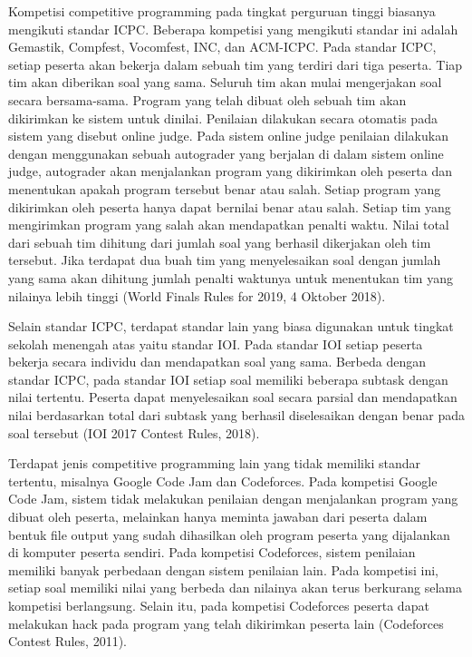 \par Kompetisi competitive programming pada tingkat perguruan tinggi biasanya mengikuti standar ICPC. Beberapa kompetisi yang mengikuti standar ini adalah Gemastik, Compfest, Vocomfest, INC, dan ACM-ICPC. Pada standar ICPC, setiap peserta akan bekerja dalam sebuah tim yang terdiri dari tiga peserta. Tiap tim akan diberikan soal yang sama. Seluruh tim akan mulai mengerjakan soal secara bersama-sama. Program yang telah dibuat oleh sebuah tim akan dikirimkan ke sistem untuk dinilai. Penilaian dilakukan secara otomatis pada sistem yang disebut online judge. Pada sistem online judge penilaian dilakukan dengan menggunakan sebuah autograder yang berjalan di dalam sistem online judge, autograder akan menjalankan program yang dikirimkan oleh peserta dan menentukan apakah program tersebut benar atau salah. Setiap program yang dikirimkan oleh peserta hanya dapat bernilai benar atau salah. Setiap tim yang mengirimkan program yang salah akan mendapatkan penalti waktu. Nilai total dari sebuah tim dihitung dari jumlah soal yang berhasil dikerjakan oleh tim tersebut. Jika terdapat dua buah tim yang menyelesaikan soal dengan jumlah yang sama akan dihitung jumlah penalti waktunya untuk menentukan tim yang nilainya lebih tinggi (World Finals Rules for 2019, 4 Oktober 2018).
\par Selain standar ICPC, terdapat standar lain yang biasa digunakan untuk tingkat sekolah menengah atas yaitu standar IOI. Pada standar IOI setiap peserta bekerja secara individu dan mendapatkan soal yang sama. Berbeda dengan standar ICPC, pada standar IOI setiap soal memiliki beberapa subtask dengan nilai tertentu. Peserta dapat menyelesaikan soal secara parsial dan mendapatkan nilai berdasarkan total dari subtask yang berhasil diselesaikan dengan benar pada soal tersebut (IOI 2017 Contest Rules, 2018).
\par Terdapat jenis competitive programming lain yang tidak memiliki standar tertentu, misalnya Google Code Jam dan Codeforces. Pada kompetisi Google Code Jam, sistem tidak melakukan penilaian dengan menjalankan program yang dibuat oleh peserta, melainkan hanya meminta jawaban dari peserta dalam bentuk file output yang sudah dihasilkan oleh program peserta yang dijalankan di komputer peserta sendiri. Pada kompetisi Codeforces, sistem penilaian memiliki banyak perbedaan dengan sistem penilaian lain. Pada kompetisi ini, setiap soal memiliki nilai yang berbeda dan nilainya akan terus berkurang selama kompetisi berlangsung. Selain itu, pada kompetisi Codeforces peserta dapat melakukan hack pada program yang telah dikirimkan peserta lain (Codeforces Contest Rules, 2011).

